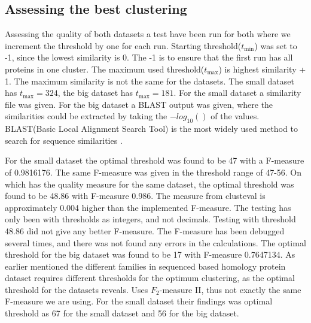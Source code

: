 \documentclass[a4paper,10pt]{article}
\theoremstyle{plain}
\theoremstyle{definition}
\begin{document}
\subsection{Assessing the best clustering}
\label{sec:bestClustering}
Assessing the quality of both datasets a test have been run for both where we increment the threshold by one for each run. Starting threshold($t_{\min}$) was set to -1, since the lowest similarity is 0. The -1 is to ensure that the first run has all proteins in one cluster. The maximum used threshold($t_{\max}$) is highest similarity + 1. The maximum similarity is not the same for the datasets. The small dataset has $t_{\max} = 324$, the big dataset has $t_{\max} = 181$. For the small dataset a similarity file was given. For the big dataset a BLAST output was given, where the similarities could be extracted by taking the $-log_{10}()$ of the values. BLAST(Basic Local Alignment Search Tool) is the most widely used method to search for sequence similarities \cite{blast}.

For the small dataset the optimal threshold was found to be 47 with a F-measure of 0.9816176. The same F-measure was given in the threshold range of 47-56. On \cite{clustEval} which has the quality measure for the same dataset, the optimal threshold was found to be 48.86 with F-measure 0.986. The measure from clusteval is approximately 0.004 higher than the implemented F-measure.
The testing has only been with thresholds as integers, and not decimals. Testing with threshold 48.86 did not give any better F-measure. The F-measure has been debugged several times, and there was not found any errors in the calculations. The optimal threshold for the big dataset was found to be 17 with F-measure 0.7647134. As earlier mentioned the different families in sequenced based homology protein dataset requires different thresholds for the optimum clustering, as the optimal threshold for the datasets reveals. \cite{partitioningBiologicalDataTC} Uses $F_2$-measure II, thus not exactly the same F-measure we are using. For the small dataset their findings was optimal threshold as 67 for the small dataset and 56 for the big dataset. 

\end{document}
